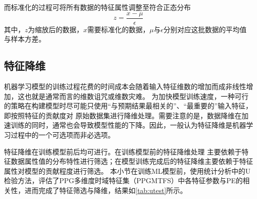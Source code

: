 而标准化的过程可将所有数据的特征属性调整至符合正态分布
\begin{equation}
  \label{equ:normalization}
  z = \frac{x - \mu}{\epsilon}
\end{equation}
其中，$z$为缩放后的数据，$x$需要标准化的数据，$\mu$与$\epsilon$分别对应这批数据的平均值与样本方差。

\subsection{特征降维}
机器学习模型的训练过程花费的时间成本会随着输入特征维数的增加而成非线性增加，这也就是通常而言的维数诅咒或维数灾难。
为加快模型训练速度，一种可行的策略在构建模型时尽可能只使用“与预期结果最相关的”、“最重要的”输入特征，即按照特征的贡献度对
原始数据集进行降维处理。需要注意的是，数据降维在加速训练的同时，通常也会导致模型性能的下降。因此，一般认为特征降维是机器学习过程中的一个可选项而非必选项。

特征降维在训练模型前后均可进行。在训练模型前的特征降维处理
主要依赖于特征数据属性值的分布特性进行筛选；在模型训练完成后的特征降维主要依赖于特征属性对模型的贡献程度进行筛选。
本小节在训练ML模型前，使用统计分析中的U检验方法，评估了PPG多维度时域特征集（PPGMTFS）中各特征参数与PE的相关性，进而完成了特征筛选与降维，结果如\autoref{tab:utest}所示。

